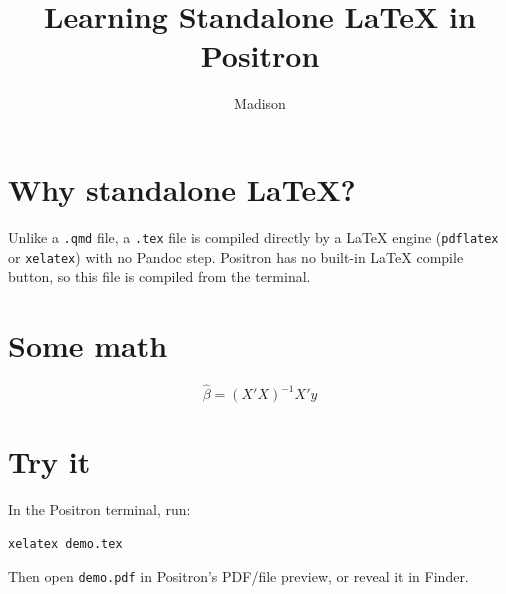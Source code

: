 \documentclass{article}
\title{Learning Standalone LaTeX in Positron}
\author{Madison}
\date{}
\begin{document}
\maketitle

\section{Why standalone LaTeX?}

Unlike a \texttt{.qmd} file, a \texttt{.tex} file is compiled directly by a
LaTeX engine (\texttt{pdflatex} or \texttt{xelatex}) with no Pandoc step.
Positron has no built-in LaTeX compile button, so this file is compiled
from the terminal.

\section{Some math}

\begin{equation}
    \hat\beta = (X'X)^{-1}X'y
\end{equation}

\section{Try it}

In the Positron terminal, run:
\begin{verbatim}
xelatex demo.tex
\end{verbatim}

Then open \texttt{demo.pdf} in Positron's PDF/file preview, or reveal it in
Finder.
\end{document}
